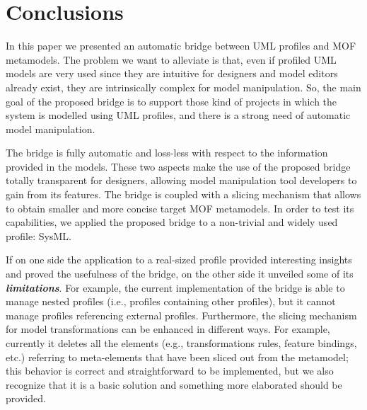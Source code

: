 \section{Conclusions}\label{sec:conclusion}
In this paper we presented an automatic bridge between UML profiles and MOF metamodels.
The problem we want to alleviate is that, even if profiled UML models are very used since they are intuitive for designers and model editors already exist, 
they are intrinsically complex for model manipulation.
So, the main goal of the proposed bridge is to support those kind of projects in which the system is modelled using UML profiles, and there is a strong need of automatic model manipulation.

The bridge is fully automatic and
loss-less with respect to the information provided in the models. 
These two aspects make the use of the proposed bridge totally transparent for designers, allowing
model manipulation tool developers to gain from its features. The bridge is coupled with a slicing mechanism
that allows to obtain smaller and more concise target MOF metamodels.
In order to test its capabilities, we applied the proposed bridge to a non-trivial and widely used profile:
SysML. 

If on one side the application to a real-sized profile provided interesting insights and proved the usefulness of the bridge, on the other side it unveiled some of its \textbf{\textit{limitations}}.
For example, the current implementation of the bridge is able to manage nested profiles (i.e., profiles containing other profiles), but it
cannot manage profiles referencing external profiles.
Furthermore, the slicing mechanism for model transformations can be enhanced in different ways. For example, currently it deletes all the
elements (e.g., transformations rules, feature bindings, etc.) referring to meta-elements that have been sliced out from the metamodel;
this behavior is correct and straightforward to be implemented, but we also recognize that it is a basic solution 
and something more elaborated should be provided.

